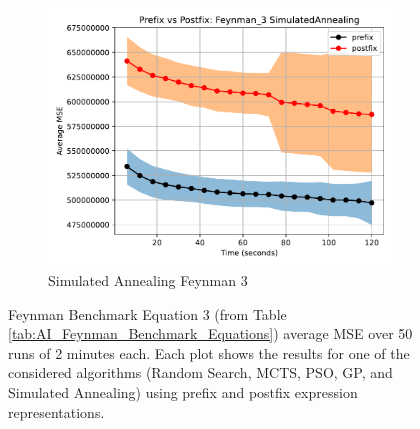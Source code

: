 \documentclass[runningheads]{llncs}
\begin{document}
\begin{figure}
    \vspace{0.5cm}
    
    \begin{subfigure}[b]{0.4\textwidth}
        \includegraphics[width=\linewidth, keepaspectratio]{AIFeynman_Benchmarks/PrePostFeynman_3SimulatedAnnealing.pdf}
        \caption{Simulated Annealing Feynman 3}
        \label{subfig:feynman_3_SA}
    \end{subfigure}
    
    \caption{Feynman Benchmark Equation 3 (from Table \ref{tab:AI_Feynman_Benchmark_Equations}) average MSE over 50 runs of 2 minutes each. Each plot shows the results for one of the considered algorithms (Random Search, MCTS, PSO, GP, and Simulated Annealing) using prefix and postfix expression representations.}
    \label{fig:AIFeynman_3_Benchmarks}
\end{figure}
\end{document}
